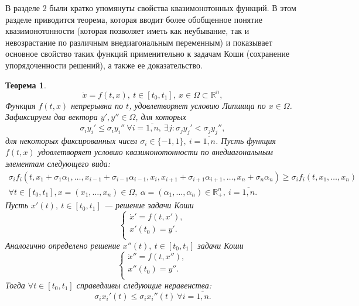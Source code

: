 \documentclass{article}
\renewcommand{\le}{\leqslant}
\renewcommand{\ge}{\geqslant}
\newtheorem{theorem}{Теорема}
\theoremstyle{definition}
\begin{document}
В разделе 2 были кратко упомянуты свойства квазимонотонных функций. В этом разделе приводится теорема, которая вводит более обобщенное понятие квазимонотонности (которая позволяет иметь как неубывание, так и невозрастание по различным внедиагональным переменным) и показывает основное свойство таких функций применительно к задачам Коши (сохранение упорядоченности решений), а также ее доказательство.
\begin{theorem}
	\begin{equation}
		\dot x = f(t, x),\ t\in [t_0,t_1],\ x \in \Omega \subset \mathbb{R}^n,
	\end{equation}
	Функция \(f(t, x)\) непрерывна по \(t\), удовлетворяет условию Липшица по \(x \in \Omega\). Зафиксируем два вектора \(y', y'' \in \Omega\), для которых
	\[\sigma_i y_i' \le \sigma_i y_i''\ \forall i = \overline{1, n},\ \exists j: \sigma_jy_j' < \sigma_j y_j'',\]	
	для некоторых фиксированных чисел \(\sigma_i \in \{-1, 1\},\ i = \overline{1, n}\). Пусть функция \(f(t, x)\) удовлетворяет условию квазимонотонности по внедиагональным элементам следующего вида:
	\begin{multline}
		\sigma_i f_i(t, x_1 + \sigma_1 \alpha_1,\dots, x_{i - 1} + \sigma_{i-1} \alpha_{i-1}, x_i, x_{i+1} + \sigma_{i+1} \alpha_{i+1}, \dots, x_n + \sigma_n \alpha_n) \ge \sigma_i f_i(t, x_1,\dots,x_n)
		\\ \forall t \in [t_0, t_1], x = (x_1,\dots,x_n) \in \Omega,\ \alpha = (\alpha_1,\dots,\alpha_n) \in \mathbb{R}^n_+,\ i = \overline{1, n}.
	\end{multline}
	Пусть \(x'(t),\ t \in [t_0, t_1]\) --- решение задачи Коши
	\begin{equation}
	\begin{cases} \label{zk1}
		\dot x' = f(t, x'), \\
		x'(t_0) = y'. \\
	\end{cases}
	\end{equation}
	Аналогично определено решение \(x''(t),\ t \in [t_0, t_1]\) задачи Коши
	\begin{equation}
	\begin{cases} \label{zk2}
		\dot x'' = f(t, x''), \\
		x''(t_0) = y''. \\
	\end{cases}
	\end{equation}
	Тогда \(\forall t \in [t_0,t_1]\) справедливы следующие неравенства:
	\begin{equation}
		\sigma_i x_i'(t) \le \sigma_i x_i''(t)\ \forall i = \overline{1,n}.
	\end{equation}
\end{theorem}
\end{document}
